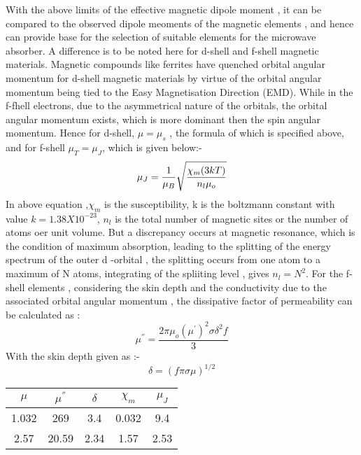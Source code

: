 \documentclass[journal]{IEEEtran}
\begin{document}
\begin{multicols}{2}
With the above limits of the effective magnetic dipole moment , it can be compared to the observed dipole meoments of the magnetic elements , and hence can provide base for the selection of suitable elements for the microwave absorber. A difference is to be noted here for d-shell and f-shell magnetic materials.  Magnetic compounds like ferrites have quenched orbital angular momentum for d-shell magnetic materials by virtue of the  orbital angular momentum being tied to the Easy Magnetisation Direction (EMD). While in the f-fhell electrons, due to the asymmetrical nature of the orbitals, the orbital angular momentum exists, which is more dominant then the spin angular momentum. Hence for d-shell, $\mu = \mu_s$ , the formula of which is specified above, and for f-shell $\mu_T= \mu_J$, which is given below:-
\begin{equation}
\mu_J = \dfrac{1}{\mu_B} \sqrt{\frac{\chi_m ( 3kT)}{n_l \mu_o}} \\
\end{equation}
In above equation ,$\chi_m$ is the susceptibility, k is the boltzmann constant with value $k = 1.38 X 10^{-23}$, $n_l$ is the total number of magnetic sites or the number of atoms oer unit volume. But a discrepancy occurs at magnetic resonance, which is the condition of maximum absorption, leading to the splitting of the energy spectrum of the outer d -orbital , the splitting occurs from one atom to a maximum of N atoms, integrating of the spliiting level , gives $n_l = N^2$.
For the f-shell elements , considering the skin depth and the conductivity due to the associated orbital angular momentum , the dissipative factor of   permeability can be calculated as :
\begin{equation}
\mu^{''} = \dfrac{2 \pi \mu_o {(\mu^{'})}^2 \sigma \delta^{2} f}{3}
\end{equation}
With the skin depth given as :-
\begin{equation}
\delta = {(f \pi \sigma \mu)}^{1/2}
\end{equation}

	\begin{tabular*}{0.5pt}{|c|c|c|c|c|}
		\hline
		$\mu$ & $ \mu^{''}$ & $\delta$ & $ \chi_m$ & $\mu_J $\\
		\hline
		1.032 & 269 &  3.4 & 0.032 &9.4 \\ 
		\hline
		2.57  & 20.59 & 2.34 & 1.57 & 2.53 \\ 
		\hline
	\end{tabular*}
\newline
\newline





\end{multicols}
\end{document}

